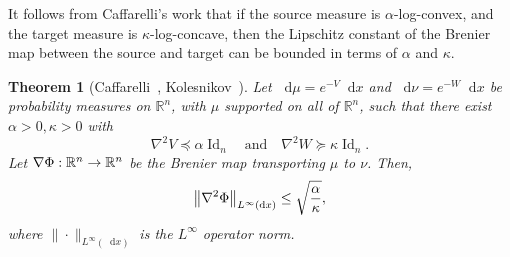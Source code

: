 \documentclass[10pt]{amsart}
\newtheorem{theo}{Theorem}[section]
\theoremstyle{definition}\newtheorem{defi}[theo]{Definition}\newtheorem{rema}[theo]{Remark}\newtheorem{exam}[theo]{Example}\newtheorem{exem}[theo]{Example}\newtheorem{nota}[theo]{Notation}
\newcommand{\R}{\mathbb R}
\DeclareMathOperator{\Id}{Id}
\newcommand{\V}{V}
\newcommand{\W}{W}
\newcommand{\dd}{n}
\newcommand{\source}{\mu}
\newcommand{\target}{\nu}
\newcommand{\lsh}{\alpha}
\newcommand{\lc}{\kappa}
\newcommand*\diff{\mathop{}\!\mathrm{d}}
\newcommand{\OT}{\Phi}
\renewcommand*{\to}{\mathchoice{\longrightarrow}{\rightarrow}{\rightarrow}{\rightarrow}}
\let\originalleft\left
\let\originalright\right
\renewcommand{\left}{\mathopen{}\mathclose\bgroup\originalleft}
\renewcommand{\right}{\aftergroup\egroup\originalright}
\begin{document}
It follows from Caffarelli's work that if the source measure is $\lsh$-log-convex, and the target measure is $\lc$-log-concave, then the Lipschitz constant of the Brenier map between the source and target can be bounded in terms of $\lsh$ and $\lc$.\label{subsec:div_OT_intro}


\begin{theo}[Caffarelli~\cite{MR1800860}, Kolesnikov~\cite{kolesnikov2011mass}]\label{thm:Caffarelli_intro}
Let $\diff\source=e^{-\V}\diff x$ and $\diff\target=e^{-\W}\diff x$ be probability measures on $\R^{\dd}$, with $\source$ supported on all of $\R^{\dd}$, such that there exist $\lsh>0,\lc>0$ with
\[
\nabla^2 \V \preceq \lsh \Id_{\dd}\quad\text{and}\quad \nabla^2\W \succeq \lc \Id_{\dd}.
\]
Let $\nabla\OT:\R^{\dd}\to\R^{\dd}$ be the Brenier map transporting $\source$ to $\target$. Then,
\begin{equation}\label{eq:Caffarelli_intro}
\left\|\nabla^2\OT\right\|_{L^{\infty}(\diff x)}\le \sqrt{ \frac{\lsh}{\lc}},
\end{equation}
where $\|\cdot\|_{L^{\infty}(\diff x)}$ is the $L^{\infty}$ operator norm.
\end{theo}
\end{document}
